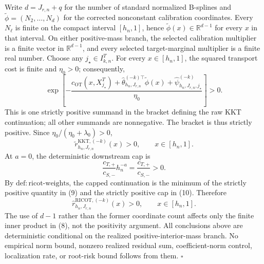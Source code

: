Write \(d=J_{r,n}+q\) for the number of standard normalized B-splines and \(\widetilde\phi=(N_2,\ldots,N_d)\) for the corrected nonconstant calibration coordinates. Every \(N_\ell\) is finite on the compact interval \([h_n,1]\), hence \(\widetilde\phi(x)\in\mathbb R^{d-1}\) for every \(x\) in that interval. On either positive-mass branch, the selected calibration multiplier is a finite vector in \(\mathbb R^{d-1}\), and every selected target-marginal multiplier is a finite real number. Choose any \(j_\star\in I^T_{k,n}\). For every \(x\in[h_n,1]\), the squared transport cost is finite and \(\eta_0>0\); consequently,
\[
\exp\!\left[-\frac{
c_{\mathrm{OT}}(x,X_{j_\star}^T)
+\widehat\theta_{h_n,J_{r,n}}^{(-k)\top}\widetilde\phi(x)
+\widehat\psi^{(-k)}_{h_n,J_{r,n},j_\star}}
{\eta_0}\right]>0.
\tag{8}
\]
This is one strictly positive summand in the bracket defining the raw KKT continuation; all other summands are nonnegative. The bracket is thus strictly positive. Since \(\eta_0/(\eta_0+\lambda_0)>0\),
\[
\widetilde r^{\mathrm{KKT},(-k)}_{h_n,J_{r,n}}(x)>0,
\qquad x\in[h_n,1].
\tag{9}
\]
At \(a=0\), the deterministic downstream cap is
\[
\frac{c_{T,+}}{c_{S,-}}h_n^{-a}
=\frac{c_{T,+}}{c_{S,-}}>0.
\tag{10}
\]
By \(\mathrm{def:ricot\text{-}weights}\), the capped continuation is the minimum of the strictly positive quantity in (9) and the strictly positive cap in (10). Therefore
\[
\widehat r^{\mathrm{RICOT},(-k)}_{h_n,J_{r,n}}(x)>0,
\qquad x\in[h_n,1].
\tag{11}
\]
The use of \(d-1\) rather than the former coordinate count affects only the finite inner product in (8), not the positivity argument. All conclusions above are deterministic conditional on the realized positive-interior-mass branch. No empirical norm bound, nonzero realized residual sum, coefficient-norm control, localization rate, or root-risk bound follows from them. \(\square\)